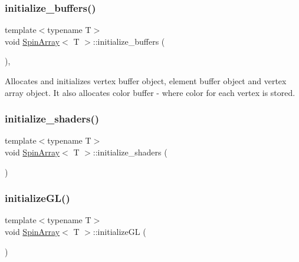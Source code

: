 \subsubsection{\texorpdfstring{initialize\+\_\+buffers()}{initialize\_buffers()}\hspace{0.1cm}{\footnotesize\ttfamily [4/4]}}
{\footnotesize\ttfamily template$<$typename T$>$ \\
void \mbox{\hyperlink{classSpinArray}{Spin\+Array}}$<$ T $>$\+::initialize\+\_\+buffers (\begin{DoxyParamCaption}{ }\end{DoxyParamCaption})\hspace{0.3cm}{\ttfamily [inline]}, {\ttfamily [private]}}



Allocates and initializes vertex buffer object, element buffer object and vertex array object. It also allocates color buffer -\/ where color for each vertex is stored. 

\mbox{\label{classSpinArray_afb77bcbce445bec1e75efe2bd16bda31}} 
\subsubsection{\texorpdfstring{initialize\+\_\+shaders()}{initialize\_shaders()}}
{\footnotesize\ttfamily template$<$typename T$>$ \\
void \mbox{\hyperlink{classSpinArray}{Spin\+Array}}$<$ T $>$\+::initialize\+\_\+shaders (\begin{DoxyParamCaption}{ }\end{DoxyParamCaption})\hspace{0.3cm}{\ttfamily [inline]}}

\mbox{\label{classSpinArray_a41d829fe76cf531a09c20f9a0b6ebf36}} 
\subsubsection{\texorpdfstring{initialize\+G\+L()}{initializeGL()}}
{\footnotesize\ttfamily template$<$typename T$>$ \\
void \mbox{\hyperlink{classSpinArray}{Spin\+Array}}$<$ T $>$\+::initialize\+GL (\begin{DoxyParamCaption}{ }\end{DoxyParamCaption})\hspace{0.3cm}{\ttfamily [inline]}}



